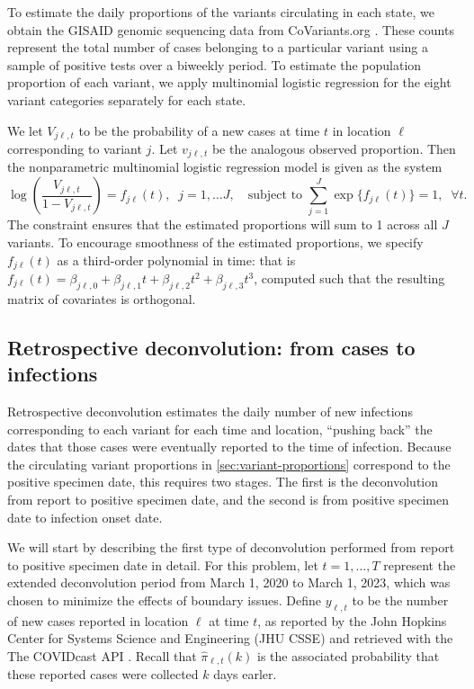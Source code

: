 To estimate the daily proportions of the variants circulating in each state, we
obtain the GISAID genomic sequencing data from CoVariants.org
\citep{hodcroft2021covariants, elbe2017data}. These counts represent the total
number of cases belonging to a particular variant using
a sample of positive tests over a biweekly period. To estimate the population
proportion of each variant, we apply multinomial logistic regression 
for the eight variant categories separately for each state.

We let $V_{j\ell,t}$ to be the probability of a new cases at time $t$ in location
$\ell$ corresponding to variant $j$. Let $v_{j\ell,t}$ be the analogous observed
proportion. Then the nonparametric multinomial logistic regression model is given
as the system
\begin{equation}
\log\left(\frac{V_{j\ell,t}}{1-V_{j\ell,t}}\right) = f_{j\ell}(t),\;\; j=1,\ldots J,\quad
\textrm{subject to }\sum_{j=1}^J \exp\{f_{j\ell}(t)\} = 1, \;\;\forall t.
\end{equation}
The constraint ensures that the estimated proportions will sum to 1 across all
$J$ variants. To encourage smoothness of the estimated proportions, we specify
$f_{j\ell}(t)$ as a third-order polynomial in time: that is $f_{j\ell}(t) =
\beta_{j\ell,0} + \beta_{j\ell,1} t + \beta_{j\ell,2}t^2 + \beta_{j\ell,3}t^3$,
computed such that the resulting matrix of covariates is orthogonal.




\subsection{Retrospective deconvolution: from cases to infections}
\label{sec:deconvolution}

Retrospective deconvolution estimates the daily number of new infections
corresponding to each variant for each time and location, ``pushing back'' the
dates that those cases were eventually reported to the time of infection.
Because the circulating variant proportions in \autoref{sec:variant-proportions}
correspond to the positive specimen date, this requires two stages. The first is
the deconvolution from report to positive specimen date, and the second is from
positive specimen date to infection onset date.

We will start by describing the first type of deconvolution performed from
report to positive specimen date in detail. For this problem, let $t=1,\ldots,T$
represent the extended deconvolution period from March 1, 2020 to March 1, 2023,
which was chosen to minimize the effects of boundary issues. Define $y_{\ell,t}$
to be the number of new cases reported in location $\ell$ at time $t$, as
reported by the John Hopkins Center for Systems Science and Engineering (JHU
CSSE)\citealp{dong2020interactive} and retrieved with the The COVIDcast API
\citep{reinhart2021open}. Recall that $\widehat{\pi}_{\ell,t}(k)$ is the
associated probability that these reported cases were collected $k$ days earler. 

